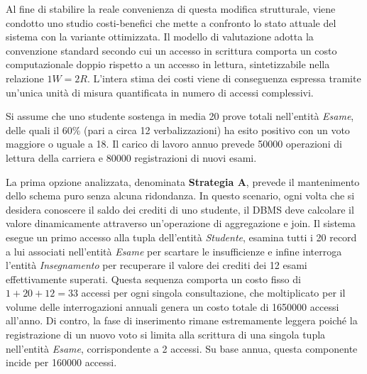 Al fine di stabilire la reale convenienza di questa modifica strutturale, viene condotto uno studio costi-benefici che mette a confronto lo stato attuale del sistema con la variante ottimizzata.
Il modello di valutazione adotta la convenzione standard secondo cui un accesso in scrittura comporta un costo computazionale doppio rispetto a un accesso in lettura, sintetizzabile nella relazione $1W = 2R$.
L'intera stima dei costi viene di conseguenza espressa tramite un'unica unità di misura quantificata in numero di accessi complessivi.

Si assume che uno studente sostenga in media \num{20} prove totali nell'entità \textit{Esame}, delle quali il $60\%$ (pari a circa \num{12} verbalizzazioni) ha esito positivo con un voto maggiore o uguale a \num{18}.
Il carico di lavoro annuo prevede \num{50000} operazioni di lettura della carriera e \num{80000} registrazioni di nuovi esami.

La prima opzione analizzata, denominata \textbf{Strategia A}, prevede il mantenimento dello schema puro senza alcuna ridondanza.
In questo scenario, ogni volta che si desidera conoscere il saldo dei crediti di uno studente, il DBMS deve calcolare il valore dinamicamente attraverso un'operazione di aggregazione e join.
Il sistema esegue un primo accesso alla tupla dell'entità \textit{Studente}, esamina tutti i \num{20} record a lui associati nell'entità \textit{Esame} per scartare le insufficienze e infine interroga l'entità \textit{Insegnamento} per recuperare il valore dei crediti dei \num{12} esami effettivamente superati. Questa sequenza comporta un costo fisso di $1 + 20 + 12 = 33$ accessi per ogni singola consultazione, che moltiplicato per il volume delle interrogazioni annuali genera un costo totale di \num{1650000} accessi all'anno.
Di contro, la fase di inserimento rimane estremamente leggera poiché la registrazione di un nuovo voto si limita alla scrittura di una singola tupla nell'entità \textit{Esame}, corrispondente a \num{2} accessi. Su base annua, questa componente incide per \num{160000} accessi.

